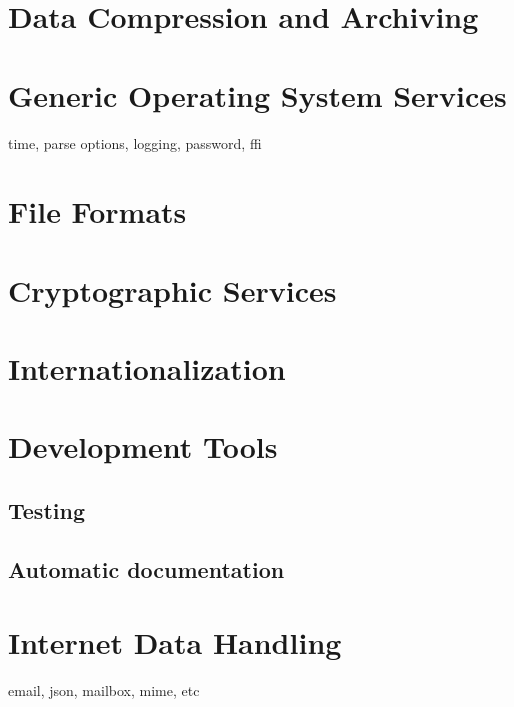 \documentclass[10pt,english]{book}
\begin{document}
\chapter{Data Compression and Archiving}

\chapter{Generic Operating System Services}

time, parse options, logging, password, ffi

\chapter{File Formats}

\chapter{Cryptographic Services}

\chapter{Internationalization}

\chapter{Development Tools}

\section{Testing}

\section{Automatic documentation}

\chapter{Internet Data Handling}

email, json, mailbox, mime, etc

\printindex
\end{document}
